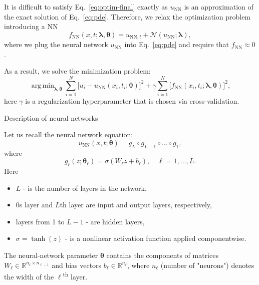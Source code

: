 \documentclass{beamer}
\renewcommand{\vec}[1]{\boldsymbol{#1}}
\newcommand{\VTheta}{\ensuremath{\vec{\theta}}}
\newcommand{\VLambda}{\ensuremath{\vec{\lambda}}}
\DeclareMathOperator*{\argmin}{arg\,min}
\newcommand{\R}{\mathbb R}
\newcommand{\UNN}[1][\text{NN}]{u_{#1}}
\newcommand{\FNN}[1][\text{NN}]{f_{#1}}
\newcommand{\NonlinOp}{\mathcal N\!}
\begin{document}
\begin{frame}
It is difficult to satisfy Eq.~\eqref{eq:optim-final} exactly as
$u_{\text{NN}}$ is an approximation of the exact solution of
Eq.~\eqref{eq:pde}.
Therefore, we relax the optimization problem introducing a NN
\begin{equation*}
    \FNN(x, t; \VLambda, \VTheta) =
        u_{\text{NN}, t} + \NonlinOp(u_{\text{NN}}; \VLambda),
\end{equation*}
where we plug the neural network $\UNN$ into Eq.~\eqref{eq:pde} and
require that $\FNN \approx 0$.

As a result, we solve the minimization problem:
\begin{equation*}
    \argmin_{\VLambda, \VTheta}
    \sum_{i=1}^N \big[ u_i - \UNN(x_i, t_i; \VTheta)\big ]^2
    +\gamma \sum_{i=1}^N \big[ \FNN(x_i, t_i; \VLambda, \VTheta) \big]^2,
\end{equation*}
here $\gamma$ is a regularization hyperparameter that is chosen via cross-validation.
    
\end{frame}

\begin{frame}{Description of neural networks}
    
Let us recall the neural network equation:
$$
\UNN(x, t; \vec{\theta}) = g_L \circ g_{L-1} \circ \dots \circ g_1,
$$
where
\[
    g_\ell(z; \VTheta_\ell) = \sigma (W_\ell z + b_\ell), \quad \ell = 1,\dots,L.
\]
Here 
\begin{itemize}
    \item $L$  - is the number of layers in the network,
    \item 0s layer and $L$th layer are input and output layers, respectively,
    \item layers from 1 to $L-1$ - are hidden layers,
    \item $\sigma = \tanh (z) $ - is a nonlinear activation function applied componentwise.
\end{itemize} 
 
The neural-network parameter $\VTheta$ contains the components of matrices
$W_\ell \in \R^{n_{\ell}\times n_{\ell-1}}$ and bias vectors
$b_\ell \in \R^{n_\ell}$, where $n_\ell$  (number of "neurons") denotes the width of the
$\ell$\textsuperscript{th} layer.
    
\end{frame}
\end{document}
